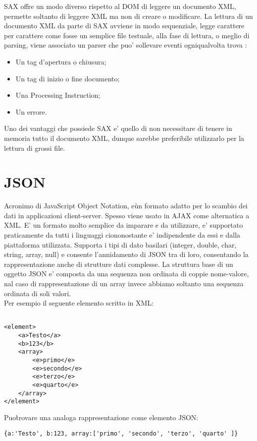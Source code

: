 \documentclass[11pt,titlepage,a4paper,twoside,openany]{book}
\begin{document}
SAX offre un modo diverso rispetto al DOM di leggere un documento XML, permette soltanto di leggere XML ma non di creare o modificare.
La lettura di un documento XML da parte di SAX avviene in modo sequenziale, legge carattere per carattere come fosse un semplice file testuale, alla fase di lettura, o meglio di parsing, viene associato un parser che puo' sollevare eventi ogniqualvolta trova :
\begin{itemize}
\item Un tag d'apertura o chiusura;
\item Un tag di inizio o fine documento;
\item Una Processing Instruction;
\item Un errore.
\end{itemize}
Uno dei vantaggi che possiede SAX e' quello di non necessitare di tenere in memoria tutto il documento XML, dunque sarebbe preferibile utilizzarlo per la lettura di grossi file.


\section{JSON}
Acronimo di JavaScript Object Notation, e\` un formato adatto per lo scambio dei dati in applicazioni client-server.
Spesso viene usato in AJAX come alternatica a XML.
E' un formato molto semplice da imparare e da utilizzare, e' supportato praticamente da tutti i linguaggi ciononostante e' indipendente da essi e dalla piattaforma utilizzata.
Supporta i tipi di dato basilari (integer, double, char, string, array, null) e consente l'annidamento di JSON tra di loro, consentando la rappresentazione anche di strutture dati complesse.
La struttura base di un oggetto JSON e' composta da una sequenza non ordinata di coppie nome-valore, nal caso di rappresentazione di un array invece abbiamo soltanto una sequenza ordinata di soli valori.
\\
Per esempio il seguente elemento scritto in XML:

\lstset{language=HTML}
\begin{lstlisting}

<element>
	<a>Testo</a>
	<b>123</b>
	<array>
		<e>primo</e>
		<e>secondo</e>
		<e>terzo</e>
		<e>quarto</e>
	</array>
</element>

\end{lstlisting}

Puo\` trovare una analoga rappresentazione come elemento JSON:

\begin{lstlisting}
{a:'Testo', b:123, array:['primo', 'secondo', 'terzo', 'quarto' ]}
\end{lstlisting}
\end{document}
